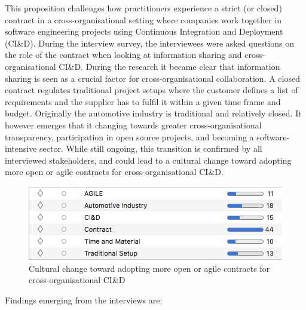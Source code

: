 This proposition challenges how practitioners experience a strict (or closed) contract in a cross-organisational setting where companies work together in software engineering projects using Continuous Integration and Deployment (CI\&D). During the interview survey, the interviewees were asked questions on the role of the contract when looking at information sharing and cross-organisational CI\&D. During the research it became clear that information sharing is seen as a crucial factor for cross-organisational collaboration. A closed contract regulates traditional project setups where the customer defines a list of requirements and the supplier has to fulfil it within a given time frame and budget. Originally the automotive industry is traditional and relatively closed. It however emerges that it changing towards greater cross-organisational transparency, participation in open source projects, and becoming a software-intensive sector. While still ongoing, this transition is confirmed by all interviewed stakeholders, and could lead to a cultural change toward adopting more open or agile contracts for cross-organisational CI\&D.


\begin{figure}[htb]
\centering
\includegraphics[width=\columnwidth]{figure/ss_CodeGroup6.png}
\caption{Cultural change toward adopting more open or agile contracts for cross-organisational CI\&D}
\label{fig:towardsAgile}
\end{figure}

Findings emerging from the interviews are:

